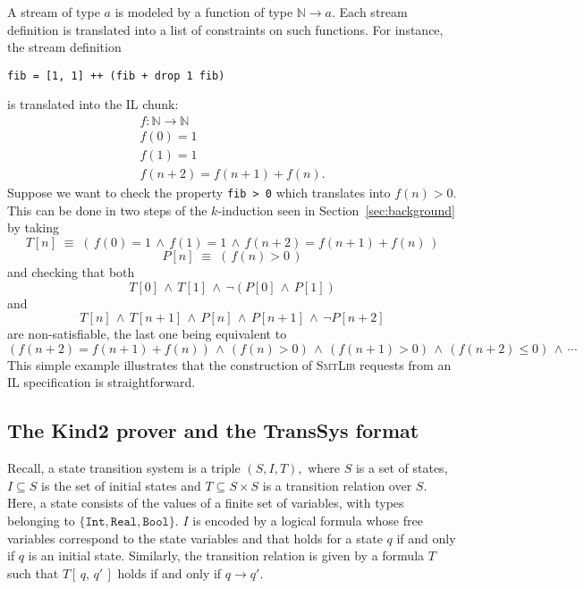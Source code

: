 A stream of type $a$ is modeled by a function of type $\mathbb{N} \to a$. Each stream definition is translated into a list of constraints on such functions. For instance, the stream definition
\begin{lstlisting}
fib = [1, 1] ++ (fib + drop 1 fib)
\end{lstlisting}
is translated into the IL chunk:
$$
\begin{array}{c}
f: \mathbb{N} \to \mathbb{N} \\
f(0) = 1 \\
f(1) = 1 \\
f(n + 2) = f(n + 1) + f(n).
\end{array}
$$
Suppose  we want to check the property \texttt{fib > 0} which translates into $f(n) > 0$. This can be done in two steps of the $k$-induction seen in Section~\ref{sec:background} by taking \[T[n] \;\equiv\; \left(\, f(0) = 1 \,\wedge\,
f(1) = 1 \,\wedge\, f(n + 2) = f(n + 1) + f(n) \,\right) \] \[P[n] \;\equiv\; \left(\, f(n) > 0 \,\right) \]
and checking that both \[T[0] \,\wedge\, T[1] \,\wedge\, \neg \left( P[0] \,\wedge\, P[1] \right) \] and \[T[n] \,\wedge\, T[n + 1] \,\wedge\, P[n] \,\wedge\, P[n + 1] \,\wedge\, \neg P[n + 2] \]
are non-satisfiable, the last one being equivalent to \[ \left(f(n+2) = f(n+1) + f(n)\right) \,\wedge\, \left(f(n) > 0\right) \,\wedge\, \left(f(n + 1) > 0\right) \,\wedge\, \left(f(n + 2) \leq 0\right)   \,\wedge\, \cdots \]
This simple example illustrates that  the construction of \textsc{SmtLib} requests from an IL specification is  straightforward.


\subsection{The Kind2 prover and the {TransSys} format}

Recall, a state transition system is a triple $(S,I,T),$
where $S$ is a set of states, $I \subseteq S$ is the set of initial
states and $T \subseteq S \times S $ is a transition relation over $S$.
Here, a state consists of  the values of a finite set of variables, with types belonging to $\{ \texttt{Int}, \texttt{Real},  \texttt{Bool}\}$. $I$ is encoded by a logical formula whose free variables correspond to the state variables and that holds for a state $q$ if and only if $q$ is an initial state. Similarly, the transition relation is given by a formula $T$ such that $T\left[\, q, \, q' \,\right]$ holds if and only if $q \rightarrow q'$. 

\medskip

